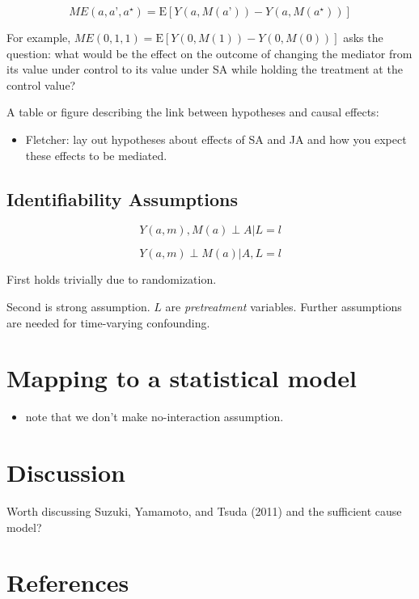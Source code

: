 \documentclass[]{article}
\providecommand{\tightlist}{%
  \setlength{\itemsep}{0pt}\setlength{\parskip}{0pt}}
\begin{document}
\[
ME(a, a’, a^{\star}) = \mathrm{E}[Y(a, M(a’)) - Y(a, M(a^{\star}))]
\]

For example, \(ME(0, 1, 1) = \mathrm{E}[Y(0, M(1)) - Y(0, M(0))]\) asks
the question: what would be the effect on the outcome of changing the
mediator from its value under control to its value under SA while
holding the treatment at the control value?

A table or figure describing the link between hypotheses and causal
effects:

\begin{itemize}
\tightlist
\item
  Fletcher: lay out hypotheses about effects of SA and JA and how you
  expect these effects to be mediated.
\end{itemize}

\subsection{Identifiability
Assumptions}\label{identifiability-assumptions}

\[
Y(a, m), M(a) \perp A | L = l
\]

\[
Y(a, m) \perp M(a) | A, L = l
\]

First holds trivially due to randomization.

Second is strong assumption. \(L\) are \emph{pretreatment} variables.
Further assumptions are needed for time-varying confounding.

\section{Mapping to a statistical
model}\label{mapping-to-a-statistical-model}

\begin{itemize}
\tightlist
\item
  note that we don't make no-interaction assumption.
\end{itemize}

\section{Discussion}\label{discussion}

Worth discussing Suzuki, Yamamoto, and Tsuda (2011) and the sufficient
cause model?

\section*{References}\label{references}
\end{document}
